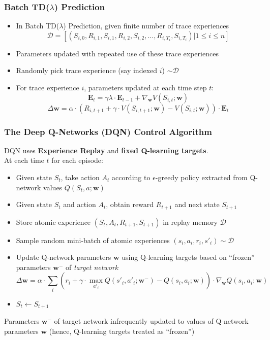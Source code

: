 \documentclass[handout]{beamer}
\begin{document}
\begin{frame}
\frametitle{Batch TD($\lambda$) Prediction}
\pause
\begin{itemize}[<+->]
\item In Batch TD($\lambda$) Prediction, given finite number of trace experiences
$$\mathcal{D} = [(S_{i,0}, R_{i,1}, S_{i,1}, R_{i,2}, S_{i,2}, \ldots, R_{i,T_i}, S_{i,T_i}) | 1 \leq i \leq n]$$
\item Parameters updated with repeated use of these trace experiences
\item Randomly pick trace experience (say indexed $i$) $\sim \mathcal{D}$
\item For trace experience $i$, parameters updated at each time step $t$:
$$\bm{E}_t = \gamma \lambda \cdot \bm{E}_{t-1} + \nabla_{\bm{w}} V(S_{i,t};\bm{w})$$
$$\Delta \bm{w} = \alpha \cdot (R_{i,t+1} + \gamma \cdot V(S_{i,t+1}; \bm{w}) - V(S_{i,t}; \bm{w})) \cdot \bm{E}_t$$
\end{itemize}
\end{frame}

\begin{frame}
\frametitle{The Deep Q-Networks (DQN) Control Algorithm}
\pause
DQN uses {\bf Experience Replay} and {\bf fixed Q-learning targets}.\\
\pause
At each time $t$ for each episode:
\begin{itemize}[<+->]
\item Given state $S_t$, take action $A_t$ according to $\epsilon$-greedy policy extracted from Q-network values $Q(S_t,a;\bm{w})$
\item Given state $S_t$ and action $A_t$, obtain reward $R_{t+1}$ and next state $S_{t+1}$
\item Store atomic experience $(S_t, A_t, R_{t+1}, S_{t+1})$ in replay memory $\mathcal{D}$
\item Sample random mini-batch  of atomic experiences $(s_i,a_i,r_i,s'_i) \sim \mathcal{D}$
\item Update Q-network parameters $\bm{w}$ using Q-learning targets based on ``frozen'' parameters $\bm{w}^-$ of {\em target network}
$$\Delta \bm{w} = \alpha \cdot \sum_i (r_i + \gamma \cdot \max_{a'_i} Q(s'_i, a'_i; \bm{w}^-) - Q(s_i,a_i;\bm{w})) \cdot \nabla_{\bm{w}} Q(s_i,a_i;\bm{w})$$ 
\item $S_t \leftarrow S_{t+1}$
\end{itemize}
\pause
Parameters $\bm{w}^-$ of target network infrequently updated to values of Q-network parameters $\bm{w}$ (hence, Q-learning targets treated as ``frozen'')
\end{frame}
\end{document}
